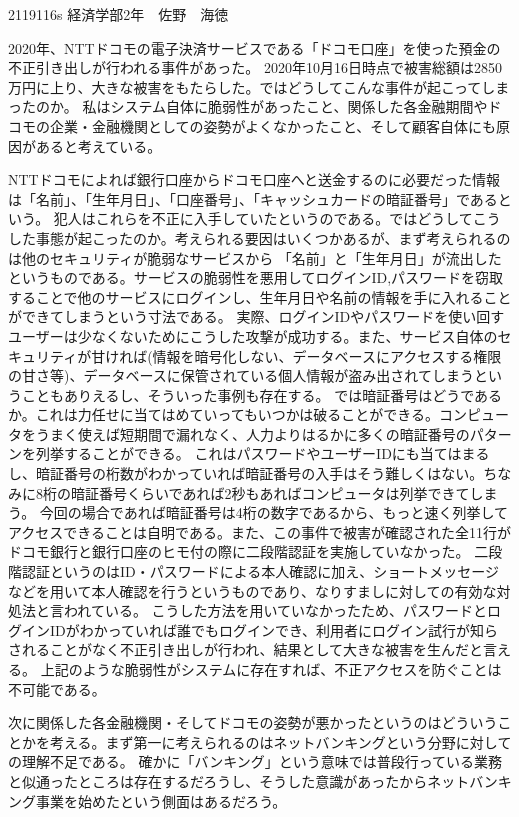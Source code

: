 \documentclass[11pt]{article}
\begin{document}
    2119116s 経済学部2年　佐野　海徳
\par 2020年、NTTドコモの電子決済サービスである「ドコモ口座」を使った預金の不正引き出しが行われる事件があった。
2020年10月16日時点で被害総額は2850万円に上り、大きな被害をもたらした。ではどうしてこんな事件が起こってしまったのか。
私はシステム自体に脆弱性があったこと、関係した各金融期間やドコモの企業・金融機関としての姿勢がよくなかったこと、そして顧客自体にも原因があると考えている。
\par NTTドコモによれば銀行口座からドコモ口座へと送金するのに必要だった情報は「名前」、「生年月日」、「口座番号」、「キャッシュカードの暗証番号」であるという。
犯人はこれらを不正に入手していたというのである。ではどうしてこうした事態が起こったのか。考えられる要因はいくつかあるが、まず考えられるのは他のセキュリティが脆弱なサービスから
「名前」と「生年月日」が流出したというものである。サービスの脆弱性を悪用してログインID,パスワードを窃取することで他のサービスにログインし、生年月日や名前の情報を手に入れることができてしまうという寸法である。
実際、ログインIDやパスワードを使い回すユーザーは少なくないためにこうした攻撃が成功する。また、サービス自体のセキュリティが甘ければ(情報を暗号化しない、データベースにアクセスする権限の甘さ等)、データベースに保管されている個人情報が盗み出されてしまうということもありえるし、そういった事例も存在する。
では暗証番号はどうであるか。これは力任せに当てはめていってもいつかは破ることができる。コンピュータをうまく使えば短期間で漏れなく、人力よりはるかに多くの暗証番号のパターンを列挙することができる。
これはパスワードやユーザーIDにも当てはまるし、暗証番号の桁数がわかっていれば暗証番号の入手はそう難しくはない。ちなみに8桁の暗証番号くらいであれば2秒もあればコンピュータは列挙できてしまう。
今回の場合であれば暗証番号は4桁の数字であるから、もっと速く列挙してアクセスできることは自明である。また、この事件で被害が確認された全11行がドコモ銀行と銀行口座のヒモ付の際に二段階認証を実施していなかった。
二段階認証というのはID・パスワードによる本人確認に加え、ショートメッセージなどを用いて本人確認を行うというものであり、なりすましに対しての有効な対処法と言われている。
こうした方法を用いていなかったため、パスワードとログインIDがわかっていれば誰でもログインでき、利用者にログイン試行が知らされることがなく不正引き出しが行われ、結果として大きな被害を生んだと言える。
上記のような脆弱性がシステムに存在すれば、不正アクセスを防ぐことは不可能である。
\par 次に関係した各金融機関・そしてドコモの姿勢が悪かったというのはどういうことかを考える。まず第一に考えられるのはネットバンキングという分野に対しての理解不足である。
確かに「バンキング」という意味では普段行っている業務と似通ったところは存在するだろうし、そうした意識があったからネットバンキング事業を始めたという側面はあるだろう。
\end{document}
